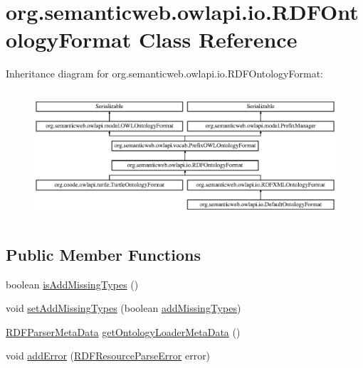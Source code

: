 \hypertarget{classorg_1_1semanticweb_1_1owlapi_1_1io_1_1_r_d_f_ontology_format}{\section{org.\-semanticweb.\-owlapi.\-io.\-R\-D\-F\-Ontology\-Format Class Reference}
\label{classorg_1_1semanticweb_1_1owlapi_1_1io_1_1_r_d_f_ontology_format}
}
Inheritance diagram for org.\-semanticweb.\-owlapi.\-io.\-R\-D\-F\-Ontology\-Format\-:\begin{figure}[H]
\begin{center}
\leavevmode
\includegraphics[height=4.813753cm]{classorg_1_1semanticweb_1_1owlapi_1_1io_1_1_r_d_f_ontology_format}
\end{center}
\end{figure}
\subsection*{Public Member Functions}
\begin{DoxyCompactItemize}
\item 
boolean \hyperlink{classorg_1_1semanticweb_1_1owlapi_1_1io_1_1_r_d_f_ontology_format_aa7e4d5ee4139d102aa8da8d2a7fc9529}{is\-Add\-Missing\-Types} ()
\item 
void \hyperlink{classorg_1_1semanticweb_1_1owlapi_1_1io_1_1_r_d_f_ontology_format_aca20ff83295a99e86d8440ba3ad7a674}{set\-Add\-Missing\-Types} (boolean \hyperlink{classorg_1_1semanticweb_1_1owlapi_1_1io_1_1_r_d_f_ontology_format_a82a12b94fa937ba1c8c06d548f3e35e3}{add\-Missing\-Types})
\item 
\hyperlink{classorg_1_1semanticweb_1_1owlapi_1_1io_1_1_r_d_f_parser_meta_data}{R\-D\-F\-Parser\-Meta\-Data} \hyperlink{classorg_1_1semanticweb_1_1owlapi_1_1io_1_1_r_d_f_ontology_format_a55be866072c03b527576b5ab4062b831}{get\-Ontology\-Loader\-Meta\-Data} ()
\item 
void \hyperlink{classorg_1_1semanticweb_1_1owlapi_1_1io_1_1_r_d_f_ontology_format_ae56ee102681de3035f9c2ef89648fc89}{add\-Error} (\hyperlink{classorg_1_1semanticweb_1_1owlapi_1_1io_1_1_r_d_f_resource_parse_error}{R\-D\-F\-Resource\-Parse\-Error} error)
\end{DoxyCompactItemize}
